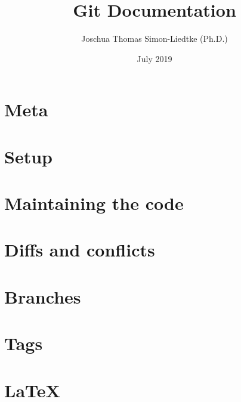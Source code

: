 \documentclass{report}
\title{Git Documentation}
\author{Joschua Thomas Simon-Liedtke (Ph.D.)}
\date{July 2019}
\begin{document}


\chapter*{Meta}



\chapter{Setup}



\chapter{Maintaining the code}



\chapter{Diffs and conflicts}



\chapter{Branches}



\chapter{Tags}



\chapter{\LaTeX}


\end{document}
